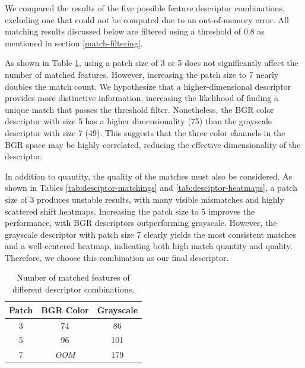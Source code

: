 We compared the results of the five possible feature descriptor combinations, 
excluding one that could not be computed due to an out-of-memory error. All 
matching results discussed below are filtered using a threshold of 0.8 as 
mentioned in section \ref{match-filtering}.

As shown in Table \ref{tab:descriptor-match-count}, using a patch size of 3 or 5 
does not significantly affect the number of matched features. However, 
increasing the patch size to 7 nearly doubles the match count. We hypothesize 
that a higher-dimensional descriptor provides more distinctive information, 
increasing the likelihood of finding a unique match that passes the threshold 
filter. Nonetheless, the BGR color descriptor with size 5 has a higher 
dimensionality (75) than the grayscale descriptor with size 7 (49). This 
suggests that the three color channels in the BGR space may be highly 
correlated, reducing the effective dimensionality of the descriptor.

In addition to quantity, the quality of the matches must also be considered. As 
shown in Tables \ref{tab:desciptor-matchings} and \ref{tab:desciptor-heatmaps}, 
a patch size of 3 produces unstable results, with many visible mismatches and 
highly scattered shift heatmaps. Increasing the patch size to 5 improves the 
performance, with BGR descriptors outperforming grayscale. However, the 
grayscale descriptor with patch size 7 clearly yields the most consistent 
matches and a well-centered heatmap, indicating both high match quantity and 
quality. Therefore, we choose this combination as our final descriptor.

\begin{table}[htbp]
    \centering
    \begin{tabular}{|c|c|c|}
        \hline
        \textbf{Patch} & \textbf{BGR Color} & \textbf{Grayscale} \\
        \hline
        3 & 74 & 86 \\
        \hline
        5 & 96 & 101 \\
        \hline
        7 & \textit{OOM} & 179 \\
        \hline
    \end{tabular}
    \caption{Number of matched features of different descriptor combinations.}
    \label{tab:descriptor-match-count}
\end{table}

